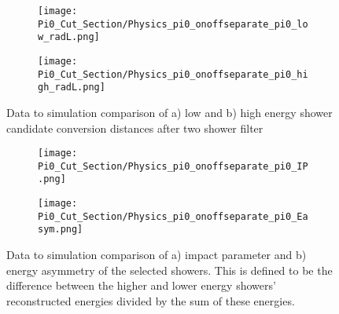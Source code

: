 \begin{figure}[H]
  \begin{subfigure}[t]{0.3\textwidth}
\texttt{[image: Pi0\_Cut\_Section/Physics\_pi0\_onoffseparate\_pi0\_low\_radL.png]}
  \caption{ }
  \end{subfigure} 
  \hspace{30mm}
  \begin{subfigure}[t]{0.3\textwidth}
\texttt{[image: Pi0\_Cut\_Section/Physics\_pi0\_onoffseparate\_pi0\_high\_radL.png]}
  \caption{ }
  \end{subfigure} 
\label{fig:physics_pi0_pi0_rl}
\caption{ Data to simulation comparison of a) low and b) high energy shower candidate conversion distances after two shower filter }
\end{figure}


\begin{figure}[H]
  \begin{subfigure}[t]{0.3\textwidth}
\texttt{[image: Pi0\_Cut\_Section/Physics\_pi0\_onoffseparate\_pi0\_IP.png]}
  \caption{ }
  \end{subfigure} 
  \hspace{30mm}
  \begin{subfigure}[t]{0.3\textwidth}
\texttt{[image: Pi0\_Cut\_Section/Physics\_pi0\_onoffseparate\_pi0\_Easym.png]}
  \caption{ }
  \end{subfigure} 
\label{fig:physics_pi0_pi0_IP}
\caption{ Data to simulation comparison of a) impact parameter and b) energy asymmetry of the selected showers. This is defined to be the difference between the higher and lower energy showers' reconstructed energies divided by the sum of these energies. }
\end{figure}

